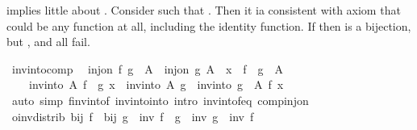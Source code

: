 \begin{isabellebody}
\endisatagproof
{\isafoldproof}%
%
\isadelimproof
%
\endisadelimproof
%
\begin{isamarkuptext}%
 implies little about . Consider  such
  that . Then it ia consistent with axiom 
  that  could be any function at all, including the identity function.
  If  then  is a bijection, but ,  and  all fail.%
\end{isamarkuptext}\isamarkuptrue%
\isamarkupfalse%
\ inv{\isacharunderscore}{\kern0pt}into{\isacharunderscore}{\kern0pt}comp{\isacharcolon}{\kern0pt}\isanewline
\ \ {\isachardoublequoteopen}inj{\isacharunderscore}{\kern0pt}on\ f\ {\isacharparenleft}{\kern0pt}g\ {\isacharbackquote}{\kern0pt}\ A{\isacharparenright}{\kern0pt}\ {\isasymLongrightarrow}\ inj{\isacharunderscore}{\kern0pt}on\ g\ A\ {\isasymLongrightarrow}\ x\ {\isasymin}\ f\ {\isacharbackquote}{\kern0pt}\ g\ {\isacharbackquote}{\kern0pt}\ A\ {\isasymLongrightarrow}\isanewline
\ \ \ \ inv{\isacharunderscore}{\kern0pt}into\ A\ {\isacharparenleft}{\kern0pt}f\ {\isasymcirc}\ g{\isacharparenright}{\kern0pt}\ x\ {\isacharequal}{\kern0pt}\ {\isacharparenleft}{\kern0pt}inv{\isacharunderscore}{\kern0pt}into\ A\ g\ {\isasymcirc}\ inv{\isacharunderscore}{\kern0pt}into\ {\isacharparenleft}{\kern0pt}g\ {\isacharbackquote}{\kern0pt}\ A{\isacharparenright}{\kern0pt}\ f{\isacharparenright}{\kern0pt}\ x{\isachardoublequoteclose}\isanewline
%
\isadelimproof
\ \ %
\endisadelimproof
%
\isatagproof
{}\isamarkupfalse%
\ {\isacharparenleft}{\kern0pt}auto\ simp{\isacharcolon}{\kern0pt}\ f{\isacharunderscore}{\kern0pt}inv{\isacharunderscore}{\kern0pt}into{\isacharunderscore}{\kern0pt}f\ inv{\isacharunderscore}{\kern0pt}into{\isacharunderscore}{\kern0pt}into\ intro{\isacharcolon}{\kern0pt}\ inv{\isacharunderscore}{\kern0pt}into{\isacharunderscore}{\kern0pt}f{\isacharunderscore}{\kern0pt}eq\ comp{\isacharunderscore}{\kern0pt}inj{\isacharunderscore}{\kern0pt}on{\isacharparenright}{\kern0pt}%
\endisatagproof
{\isafoldproof}%
%
\isadelimproof
\isanewline
%
\endisadelimproof
\isanewline
{}\isamarkupfalse%
\ o{\isacharunderscore}{\kern0pt}inv{\isacharunderscore}{\kern0pt}distrib{\isacharcolon}{\kern0pt}\ {\isachardoublequoteopen}bij\ f\ {\isasymLongrightarrow}\ bij\ g\ {\isasymLongrightarrow}\ inv\ {\isacharparenleft}{\kern0pt}f\ {\isasymcirc}\ g{\isacharparenright}{\kern0pt}\ {\isacharequal}{\kern0pt}\ inv\ g\ {\isasymcirc}\ inv\ f{\isachardoublequoteclose}\isanewline

\end{isabellebody}
